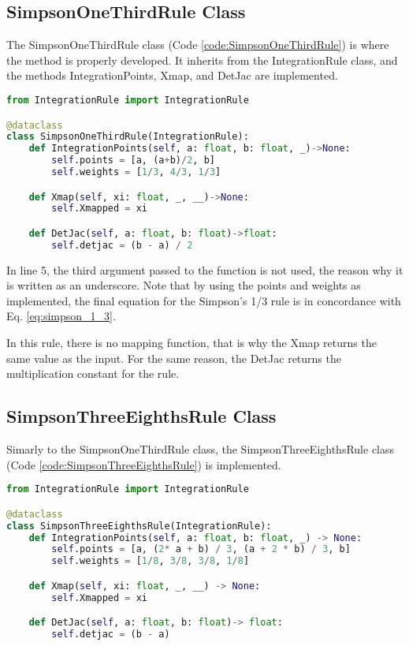 \subsection{SimpsonOneThirdRule Class}
The SimpsonOneThirdRule class (Code \ref{code:SimpsonOneThirdRule}) is where the method is properly developed. It inherits from the IntegrationRule class, and the methods IntegrationPoints, Xmap, and DetJac are implemented.
\begin{lstlisting}[language=python, caption={SimpsonOneThirdRule Class.}, label={code:SimpsonOneThirdRule}]
from IntegrationRule import IntegrationRule

@dataclass 
class SimpsonOneThirdRule(IntegrationRule):
    def IntegrationPoints(self, a: float, b: float, _)->None:
        self.points = [a, (a+b)/2, b]
        self.weights = [1/3, 4/3, 1/3]

    def Xmap(self, xi: float, _, __)->None:
        self.Xmapped = xi

    def DetJac(self, a: float, b: float)->float:
        self.detjac = (b - a) / 2
\end{lstlisting}

In line 5, the third argument passed to the function is not used, the reason why it is written as an underscore. Note that by using the points and weights as implemented, the final equation for the Simpson's 1/3 rule is in concordance with Eq. \eqref{eq:simpson_1_3}. 

In this rule, there is no mapping function, that is why the Xmap returns the same value as the input. For the same reason, the DetJac returns the multiplication constant for the rule.


\subsection{SimpsonThreeEighthsRule Class}
Simarly to the SimpsonOneThirdRule class, the SimpsonThreeEighthsRule class (Code \ref{code:SimpsonThreeEighthsRule}) is implemented.
\begin{lstlisting}[language=python, caption={SimpsonThreeEighthsRule Class.}, label={code:SimpsonThreeEighthsRule}]
from IntegrationRule import IntegrationRule

@dataclass
class SimpsonThreeEighthsRule(IntegrationRule):
    def IntegrationPoints(self, a: float, b: float, _) -> None:
        self.points = [a, (2* a + b) / 3, (a + 2 * b) / 3, b]
        self.weights = [1/8, 3/8, 3/8, 1/8]

    def Xmap(self, xi: float, _, __) -> None:
        self.Xmapped = xi

    def DetJac(self, a: float, b: float)-> float:
        self.detjac = (b - a)
\end{lstlisting}

